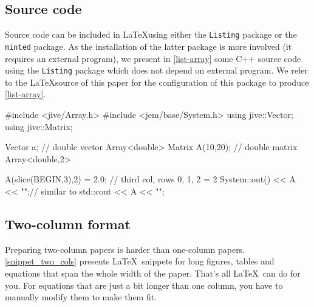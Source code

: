\documentclass[authoryear,12pta4paper,fleqn]{article}
\numberwithin{equation}{section}
\theoremstyle{remark}
\begin{document}
\subsection{Source code}\label{sec:source-code}

Source code can be included in \LaTeX using either the \texttt{Listing} package or the \texttt{minted} package. As the installation of the latter package is more involved (it requires an external program), we present in \cref{list-array} some C++ source code using the \texttt{Listing} package which does not depend on external program. We refer to the \LaTeX source of this paper for the configuration of this package to produce \cref{list-array}.

\begin{code-c-num}[caption={Presentation of source code using the \texttt{Listing} package with the Bera Mono font (\url{https://tug.org/FontCatalogue/beramono/}). },
                   label={list-array},framerule=1pt]
    #include <jive/Array.h>
    #include <jem/base/System.h>
    using jive::Vector;    
    using jive::Matrix;
    
    Vector      a;             // double vector Array<double>
    Matrix      A(10,20);      // double matrix Array<double,2>

    A(slice(BEGIN,3),2) = 2.0; // third col, rows 0, 1, 2 = 2
    System::out() << A << "\n";// similar to std::cout << A << "\n";
\end{code-c-num}

\subsection{Two-column format}\label{sec:two-col}

Preparing two-column papers is harder than one-column papers. \cref{snippet_two_cols} presents \LaTeX\ snippets for long figures, tables and equations that span the whole width of the paper. That's all \LaTeX\ can do for you. For equations that are just a bit longer than one column, you have to manually modify them to make them fit.
\end{document}
